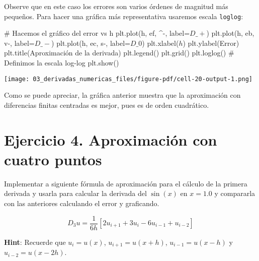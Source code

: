 \documentclass[
  letterpaper,
  DIV=11,
  numbers=noendperiod]{scrreprt}
\newenvironment{Shaded}{\begin{snugshade}}{\end{snugshade}}
\newcommand{\CommentTok}[1]{\textcolor[rgb]{0.37,0.37,0.37}{#1}}
\newcommand{\NormalTok}[1]{\textcolor[rgb]{0.00,0.23,0.31}{#1}}
\newcommand{\OperatorTok}[1]{\textcolor[rgb]{0.37,0.37,0.37}{#1}}
\newcommand{\StringTok}[1]{\textcolor[rgb]{0.13,0.47,0.30}{#1}}
\begin{document}
Observe que en este caso los errores son varios órdenes de magnitud más
pequeños. Para hacer una gráfica más representativa usaremos escala
\texttt{loglog}:

\begin{Shaded}
\begin{Highlighting}[]
\CommentTok{\# Hacemos el gráfico del error vs h}
\NormalTok{plt.plot(h, ef, }\StringTok{\textquotesingle{}\^{}{-}\textquotesingle{}}\NormalTok{, label}\OperatorTok{=}\StringTok{\textquotesingle{}$D\_+$\textquotesingle{}}\NormalTok{)}
\NormalTok{plt.plot(h, eb, }\StringTok{\textquotesingle{}v{-}\textquotesingle{}}\NormalTok{, label}\OperatorTok{=}\StringTok{\textquotesingle{}$D\_{-}$\textquotesingle{}}\NormalTok{)}
\NormalTok{plt.plot(h, ec, }\StringTok{\textquotesingle{}s{-}\textquotesingle{}}\NormalTok{, label}\OperatorTok{=}\StringTok{\textquotesingle{}$D\_0$\textquotesingle{}}\NormalTok{)}
\NormalTok{plt.xlabel(}\StringTok{\textquotesingle{}$h$\textquotesingle{}}\NormalTok{)}
\NormalTok{plt.ylabel(}\StringTok{\textquotesingle{}Error\textquotesingle{}}\NormalTok{)}
\NormalTok{plt.title(}\StringTok{\textquotesingle{}Aproximación de la derivada\textquotesingle{}}\NormalTok{)}
\NormalTok{plt.legend()}
\NormalTok{plt.grid()}
\NormalTok{plt.loglog()  }\CommentTok{\# Definimos la escala log{-}log}
\NormalTok{plt.show()}
\end{Highlighting}
\end{Shaded}

\texttt{[image: 03\_derivadas\_numericas\_files/figure-pdf/cell-20-output-1.png]}

Como se puede apreciar, la gráfica anterior muestra que la aproximación
con diferencias finitas centradas es mejor, pues es de orden cuadrático.

\section{Ejercicio 4. Aproximación con cuatro
puntos}\label{ejercicio-4.-aproximaciuxf3n-con-cuatro-puntos}

Implementar a siguiente fórmula de aproximación para el cálculo de la
primera derivada y usarla para calcular la derivada del \(\sin(x)\) en
\(x=1.0\) y compararla con las anteriores calculando el error y
graficando.

\[
D_3 u = \dfrac{1}{6 h} 
\left[ 2u_{i+1} + 3u_{i} - 6u_{i-1} + u_{i-2} \right]
\]

\textbf{Hint}: Recuerde que \(u_i = u(x)\), \(u_{i+1} = u(x+h)\),
\(u_{i-1} = u(x-h)\) y \(u_{i-2} = u(x-2h)\).
\end{document}
